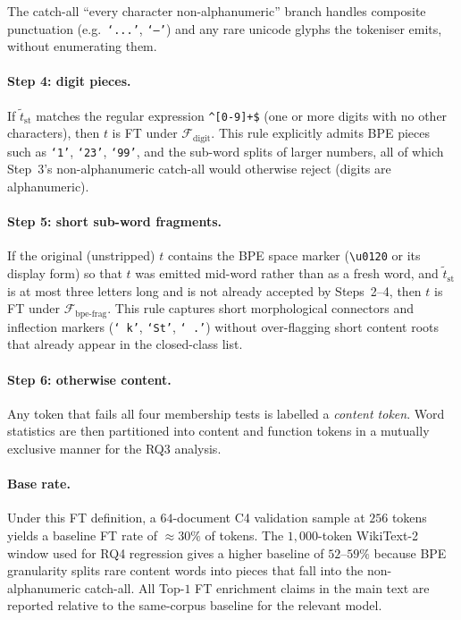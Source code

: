 The catch-all ``every character non-alphanumeric'' branch handles
composite punctuation (e.g.\ \texttt{`...'}, \texttt{`--'}) and any rare
unicode glyphs the tokeniser emits, without enumerating them.

\paragraph{Step 4: digit pieces.}
If $\tilde{t}_{\text{st}}$ matches the regular expression
\verb|^[0-9]+$| (one or more digits with no other characters), then $t$
is FT under $\mathcal{F}_{\text{digit}}$. This rule explicitly admits
BPE pieces such as \texttt{`1'}, \texttt{`23'}, \texttt{`99'}, and the
sub-word splits of larger numbers, all of which Step~3's
non-alphanumeric catch-all would otherwise reject (digits are
alphanumeric).

\paragraph{Step 5: short sub-word fragments.}
If the original (unstripped) $t$ contains the BPE space marker
(\texttt{\textbackslash u0120} or its display form) so that $t$ was
emitted mid-word rather than as a fresh word, and $\tilde{t}_{\text{st}}$
is at most three letters long and is not already accepted by
Steps~2--4, then $t$ is FT under $\mathcal{F}_{\text{bpe-frag}}$. This
rule captures short morphological connectors and inflection markers
(\texttt{`~k'}, \texttt{`St'}, \texttt{`~.'}) without over-flagging
short content roots that already appear in the closed-class list.

\paragraph{Step 6: otherwise content.}
Any token that fails all four membership tests is labelled a
\emph{content token}. Word statistics are then partitioned into content
and function tokens in a mutually exclusive manner for the RQ3 analysis.

\paragraph{Base rate.}
Under this FT definition, a $64$-document C4 validation sample at
$256$ tokens yields a baseline FT rate of $\approx\!30\%$ of tokens.
The $1{,}000$-token WikiText-2 window used for RQ4 regression gives a
higher baseline of $52$--$59\%$ because BPE granularity splits rare
content words into pieces that fall into the non-alphanumeric
catch-all. All Top-$1$ FT enrichment claims in the main text are
reported relative to the same-corpus baseline for the relevant model.

